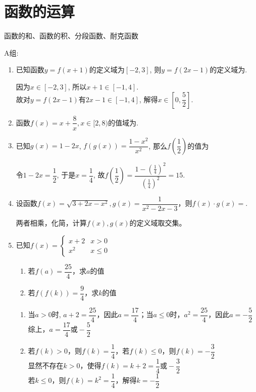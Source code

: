 \section{函数的运算}

\zsd 函数的和、函数的积、分段函数、耐克函数

A组:
\begin{enumerate}
\item 已知函数$y=f(x+1)$的定义域为$[-2,3]$, 则$y=f(2x-1)$的定义域为.
\begin{jieda}
因为$x\in[-2,3]$, 所以$x+1\in[-1,4]$.\\
故对$y=f(2x-1)$有$2x-1\in[-1,4]$, 解得$x\in\left[0,\dfrac{5}{2}\right]$.
\end{jieda} 

\item 函数$f(x) = x + \dfrac{8}{x}, x \in  [2, 8)$的值域为\blkda[2]{$[4\sqrt{2}, 9)$}. 

\item 已知$g(x)=1-2x$, $f(g(x))=\dfrac{1-x^2}{x^2}$, 那么$f\left(\dfrac{1}{2}\right)$的值为
\begin{jieda}
令$1-2x=\dfrac{1}{2}$, 于是$x=\dfrac{1}{4}$, 故$f\left(\dfrac{1}{2}\right)=\dfrac{1-(\frac{1}{4})^2}{(\frac{1}{4})^2}=15$. 
\end{jieda}


\item 设函数$f(x) = \sqrt{3+2x-x^2}, g(x) = \dfrac{1}{x^2-2x-3}$，则$f(x) \cdot g(x)=$.
\begin{jieda}
两者相乘，化简，计算$f(x), g(x)$的定义域取交集。
\end{jieda}
\item 已知$f(x) = \left \{ \begin{array}{ll}
    x+2 & x > 0 \\
    x^2 & x \leq 0
\end{array}\right.$
\begin{enumerate}
    \item 若$f(a) = \dfrac{25}{4}$，求$a$的值
    \item 若$f(f(k)) = \dfrac{9}{4}$，求$k$的值
\end{enumerate}
\begin{jieda}
\begin{enumerate}
    \item 当$a > 0$时, $a+2 = \dfrac{25}{4}$，因此$a = \dfrac{17}{4}$；当$a \leq 0$时，$a^2 = \dfrac{25}{4}$，因此$a = -\dfrac{5}{2}$ \\
    综上，$a = \dfrac{17}{4} \mbox{或} -\dfrac{5}{2}$
    \item 若$f(k) > 0$，则$f(k) = \dfrac{1}{4}$，若$f(k) \leq 0$，则$f(k) = -\dfrac{3}{2}$\\
    显然不存在$k > 0$，使得$f(k) = k+2 = \dfrac{1}{4} \mbox{或} -\dfrac{3}{2}$ \\
    若$k \leq 0$，则$f(k) = k^2 = \dfrac{1}{4}$，解得$k = -\dfrac{1}{2}$
\end{enumerate}
\end{jieda}
\begin{vspace_}
\vsp[3]
\end{vspace_}



\end{enumerate}
